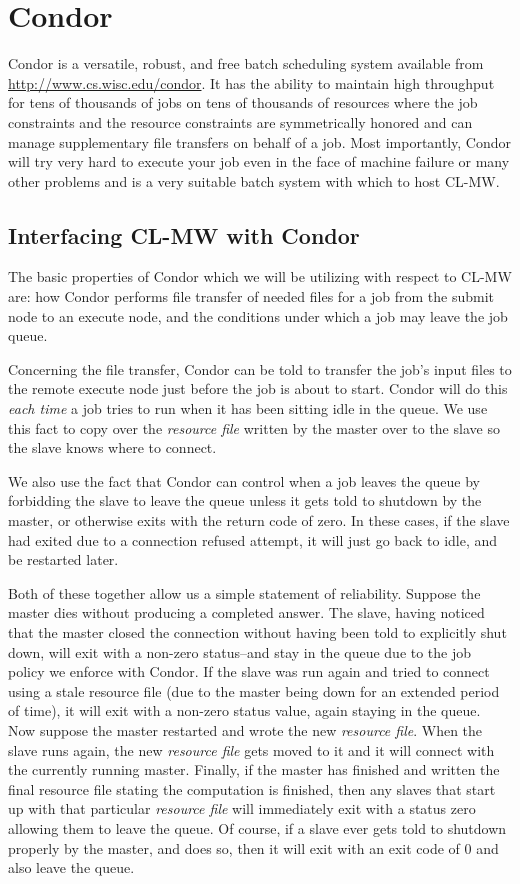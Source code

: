 \documentclass[titlepage,12pt]{book}
\newcommand{\xsmall}{\latexhtml{\small}{}}
\newcommand{\xnormalsize}{\latexhtml{\normalsize}{}}
\newcommand{\clmw}{\xsmall\textsc{CL-MW}\xnormalsize\xspace}
\newcommand{\rfile}{\textit{resource file}\xspace}
\begin{document}
\section{Condor}

Condor is a versatile, robust, and free batch scheduling system
available from \url{http://www.cs.wisc.edu/condor}. It has the ability
to maintain high throughput for tens of thousands of jobs on tens of
thousands of resources where the job constraints and the resource
constraints are symmetrically honored and can manage supplementary
file transfers on behalf of a job. Most importantly, Condor will try
very hard to execute your job even in the face of machine failure or
many other problems and is a very suitable batch system with which
to host \clmw.

\subsection{Interfacing \clmw with Condor}

The basic properties of Condor which we will be utilizing with respect
to \clmw are: how Condor performs file transfer of needed files for
a job from the submit node to an execute node, and the conditions
under which a job may leave the job queue.

Concerning the file transfer, Condor can be told to transfer the
job's input files to the remote execute node just before the job is
about to start.  Condor will do this \emph{each time} a job tries to
run when it has been sitting idle in the queue. We use this fact to
copy over the \rfile written by the master over to the slave so the
slave knows where to connect.

We also use the fact that Condor can control when a job leaves the
queue by forbidding the slave to leave the queue unless it gets told
to shutdown by the master, or otherwise exits with the return code
of zero. In these cases, if the slave had exited due to a connection
refused attempt, it will just go back to idle, and be restarted later.

Both of these together allow us a simple statement of reliability.
Suppose the master dies without producing a completed answer.
The slave, having noticed that the master closed the connection
without having been told to explicitly shut down, will exit with
a non-zero status--and stay in the queue due to the job policy
we enforce with Condor.  If the slave was run again and tried to
connect using a stale resource file (due to the master being down
for an extended period of time), it will exit with a non-zero status
value, again staying in the queue.  Now suppose the master restarted
and wrote the new \rfile.  When the slave runs again, the new \rfile
gets moved to it and it will connect with the currently running master.
Finally, if the master has finished and written the final resource
file stating the computation is finished, then any slaves that start
up with that particular \rfile will immediately exit with a status
zero allowing them to leave the queue. Of course, if a slave ever
gets told to shutdown properly by the master, and does so, then it
will exit with an exit code of 0 and also leave the queue.
\end{document}
